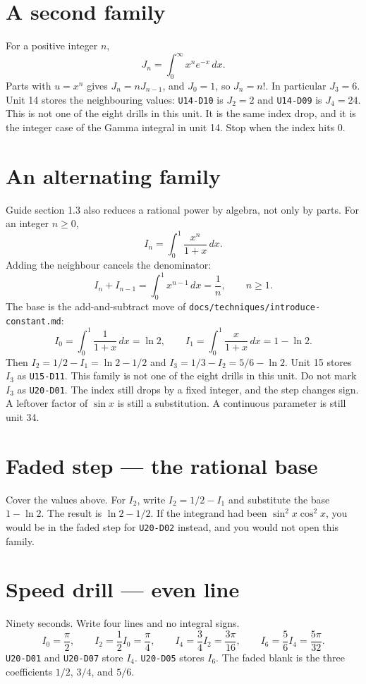 \section{A second family}
For a positive integer $n$,
\[
J_n=\int_0^\infty x^n e^{-x}\,dx.
\]
Parts with $u=x^n$ gives $J_n=n J_{n-1}$, and $J_0=1$, so $J_n=n!$. In particular $J_3=6$. Unit 14 stores the neighbouring values: \texttt{U14-D10} is $J_2=2$ and \texttt{U14-D09} is $J_4=24$. This is not one of the eight drills in this unit. It is the same index drop, and it is the integer case of the Gamma integral in unit 14. Stop when the index hits 0.

\section{An alternating family}
Guide section 1.3 also reduces a rational power by algebra, not only by parts. For an integer $n\ge 0$,
\[
I_n=\int_0^1\frac{x^n}{1+x}\,dx.
\]
Adding the neighbour cancels the denominator:
\[
I_n+I_{n-1}=\int_0^1 x^{n-1}\,dx=\frac1n,\qquad n\ge 1.
\]
The base is the add-and-subtract move of \texttt{docs/techniques/introduce-constant.md}:
\[
I_0=\int_0^1\frac{1}{1+x}\,dx=\ln 2,
\qquad
I_1=\int_0^1\frac{x}{1+x}\,dx=1-\ln 2.
\]
Then $I_2=1/2-I_1=\ln 2-1/2$ and $I_3=1/3-I_2=5/6-\ln 2$. Unit 15 stores $I_3$ as \texttt{U15-D11}. This family is not one of the eight drills in this unit. Do not mark $I_3$ as \texttt{U20-D01}. The index still drops by a fixed integer, and the step changes sign. A leftover factor of $\sin x$ is still a substitution. A continuous parameter is still unit 34.

\section{Faded step --- the rational base}
Cover the values above. For $I_2$, write $I_2=1/2-I_1$ and substitute the base $1-\ln 2$. The result is $\ln 2-1/2$. If the integrand had been $\sin^2 x\cos^2 x$, you would be in the faded step for \texttt{U20-D02} instead, and you would not open this family.

\section{Speed drill --- even line}
Ninety seconds. Write four lines and no integral signs.
\[
I_0=\frac{\pi}{2},\qquad
I_2=\frac{1}{2}I_0=\frac{\pi}{4},\qquad
I_4=\frac{3}{4}I_2=\frac{3\pi}{16},\qquad
I_6=\frac{5}{6}I_4=\frac{5\pi}{32}.
\]
\texttt{U20-D01} and \texttt{U20-D07} store $I_4$. \texttt{U20-D05} stores $I_6$. The faded blank is the three coefficients $1/2$, $3/4$, and $5/6$.


